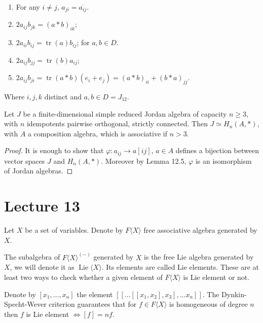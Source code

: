 \documentclass{article}
\begin{document}
\begin{lemma}  
\begin{enumerate}  
    \item[(i)] For any $i \neq j$, $a_{ji} = \overline{a_{ij}}$.  
    \item[(ii)] $2 a_{ij} b_{jk} = (a * b)_{ik}$;   
    \item[(iii)] $2 a_{ii} b_{ij} = \operatorname{tr}(a) b_{ij}$; for $a,b \in D$.  
    \item[(iv)] $2 a_{ij} b_{jj} = \operatorname{tr}(b) a_{ij}$;  
    \item[(v)] $2 a_{ij} b_{ji} = \operatorname{tr}(a * b)(e_i+e_j) = (a*  b)_{ii} + (b* a)_{jj}$.  
\end{enumerate}  
Where $ i,j,k $ distinct and $ a,b \in D =J_{12} $.  
\end{lemma} 

\begin{theorem}  
Let $J$ be a finite-dimensional simple reduced Jordan algebra of capacity $n \ge 3$, with $n$ idempotents pairwise orthogonal, strictly connected.  
Then $J \simeq H_n(A, *)$, with $A$ a composition algebra, which is associative if $n>3$.  
\end{theorem}  

\begin{proof}  
It is enough to show that $\varphi: a_{ij} \to a[ij]$, $a \in A$ defines a bijection between vector spaces $J$ and $H_n(A, *)$. Moreover by Lemma 12.5, $\varphi$ is an isomorphism of Jordan algebras.  
\end{proof} 

\section{Lecture 13}

Let $X$ be a set of variables. Denote by $F\langle X \rangle$ free associative algebra generated by $X$.  

The subalgebra of $F\langle X \rangle^{(-)}$ generated by $X$ is the free Lie algebra generated by $X$, we will denote it as $\operatorname{Lie}\langle X \rangle$. Its elements are called Lie elements. These are at least two ways to check whether a given element of $F\langle X \rangle$ is Lie element or not.  

Denote by $[x_1,\dots,x_n]$ the element $[[...[[x_1,x_2],x_3],...x_n]]$. The Dynkin-Specht-Wever criterion guarantees that for $f \in F\langle X \rangle$ is homogeneous of degree $n$ then $f$ is Lie element $\iff [f]=nf$.  
\end{document}
